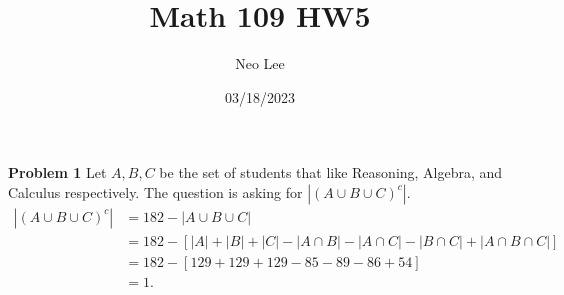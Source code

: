 \documentclass{article}
\title{Math 109 HW5}
\author{Neo Lee}
\date{03/18/2023}
\begin{document}
 

\maketitle 
\textbf{Problem 1}
Let $A, B, C$ be the set of students that like Reasoning, Algebra, and Calculus respectively.
The question is asking for $|(A\cup B \cup C)^c|$.
\begin{align}
    |(A\cup B \cup C)^c| & = 182 - |A\cup B \cup C| \nonumber\\
    & = 182-\left[|A|+|B|+|C|-|A\cap B|-|A\cap C|-|B\cap C|+|A\cap B\cap C|\right] \nonumber\\
    & = 182 - \left[129 + 129 + 129 -85 -89-86+54\right] \nonumber\\
    & =1.\nonumber
\end{align}
\bigbreak

\end{document}
